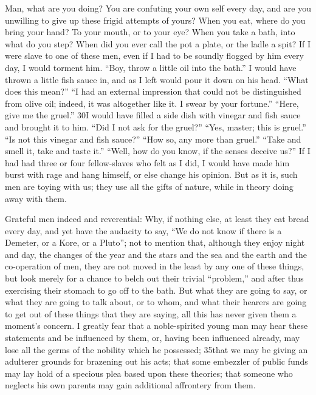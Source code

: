 Man, what are you doing? You are confuting your own self every day, and are you unwilling to give up these frigid attempts of yours? When you eat, where do you bring your hand? To your mouth, or to your eye? When you take a bath, into what do you step? When did you ever call the pot a plate, or the ladle a spit? If I were slave to one of these men, even if I had to be soundly flogged by him every day, I would torment him. ``Boy, throw a little oil into the bath.'' I would have thrown a little fish sauce in, and as I left would pour it down on his head. ``What does this mean?'' ``I had an external impression that could not be distinguished from olive oil; indeed, it was altogether like it. I swear by your fortune.'' ``Here, give me the gruel.'' 30I would have filled a side dish with vinegar and fish sauce and brought it to him. ``Did I not ask for the gruel?'' ``Yes, master; this is gruel.'' ``Is not this vinegar and fish sauce?'' ``How so, any more than gruel.'' ``Take and smell it, take and taste it.'' ``Well, how do you know, if the senses deceive us?'' If I had had three or four fellow-slaves who felt as I did, I would have made him burst with rage and hang himself, or else change his opinion. But as it is, such men are toying with us; they use all the gifts of nature, while in theory doing away with them.

Grateful men indeed and reverential: Why, if nothing else, at least they eat bread every day, and yet have the audacity to say, ``We do not know if there is a Demeter, or a Kore, or a Pluto''; not to mention that, although they enjoy night and day, the changes of the year and the stars and the sea and the earth and the co-operation of men, they are not moved in the least by any one of these things, but look merely for a chance to belch out their trivial ``problem,'' and after thus exercising their stomach to go off to the bath. But what they are going to say, or what they are going to talk about, or to whom, and what their hearers are going to get out of these things that they are saying, all this has never given them a moment's concern. I greatly fear that a noble-spirited young man may hear these statements and be influenced by them, or, having been influenced already, may lose all the germs of the nobility which he possessed; 35that we may be giving an adulterer grounds for brazening out his acts; that some embezzler of public funds may lay hold of a specious plea based upon these theories; that someone who neglects his own parents may gain additional affrontery from them.

